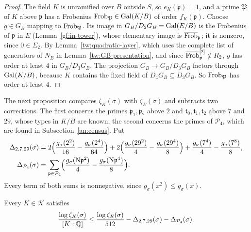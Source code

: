 \begin{proof}
The field $K$ is unramified over $B$ outside $S$, so $e_K(\mathfrak p)=1$,
and a prime $\mathfrak P$ of $K$ above $\mathfrak p$ has a Frobenius
$\operatorname{Frob}_{\mathfrak P}\in\operatorname{Gal}(K/B)$ of order $f_K(\mathfrak p)$. Choose
$g\in G_B$ mapping to $\operatorname{Frob}_{\mathfrak P}$. Its image in
$G_B/D_2G_B=\operatorname{Gal}(E/B)$ is the Frobenius of $\mathfrak p$ in $E$
(Lemma~\ref{gf:in-tower}), whose elementary image is $\overline{\operatorname{Frob}}_{\mathfrak p}$; it is
nonzero, since $0\in\Sigma_2$. By Lemma~\ref{tw:quadratic-layer}, which uses
the complete list of generators of $N_B$ in
Lemma~\ref{tw:GB-presentation}, and since $\overline{\operatorname{Frob}}_{\mathfrak p}^{[2]}\notin R_2$,
$g$ has order at least $4$ in $G_B/D_3G_B$. The projection $G_B\to G_B/D_3G_B$
factors through $\operatorname{Gal}(K/B)$, because $K$ contains the fixed field of
$D_4G_B\subseteq D_3G_B$. So $\operatorname{Frob}_{\mathfrak P}$ has order at least $4$.
\end{proof}

The next proposition compares $\zeta_K(\sigma)$ with $\zeta_E(\sigma)$ and
subtracts two corrections. The first concerns the primes
$\mathfrak p_1,\mathfrak p_2$ above $2$ and $\mathfrak t_0,\mathfrak
t_1,\mathfrak t_2$ above $7$ and $29$, whose types in $K/B$ are known; the
second concerns the primes of $\mathcal P_4$, which are found in
Subsection~\ref{an:census}. Put
\begin{align}
 \Delta_{2,7,29}(\sigma)&=2\Bigl(\frac{g_\sigma(2^2)}{16}
 -\frac{g_\sigma(2^4)}{64}\Bigr)
 +2\Bigl(\frac{g_\sigma(29^2)}4-\frac{g_\sigma(29^4)}8\Bigr)
 +\frac{g_\sigma(7^4)}4-\frac{g_\sigma(7^8)}8,
 \label{an:sel}\\
 \Delta_{\mathcal P_4}(\sigma)&=\sum_{\mathfrak p\in\mathcal P_4}
 \Bigl(\frac{g_\sigma(\mathrm N\mathfrak p^2)}4
 -\frac{g_\sigma(\mathrm N\mathfrak p^4)}8\Bigr).
 \label{an:cen}
\end{align}
Every term of both sums is nonnegative, since $g_\sigma(x^2)\le g_\sigma(x)$.

\begin{proposition}\label{an:Ystar}
Every $K\in\mathcal K$ satisfies
\[
 \frac{\log\zeta_K(\sigma)}{[K:\mathbb Q]}
 \le\frac{\log\zeta_E(\sigma)}{512}-\Delta_{2,7,29}(\sigma)
 -\Delta_{\mathcal P_4}(\sigma).
\]
\end{proposition}

